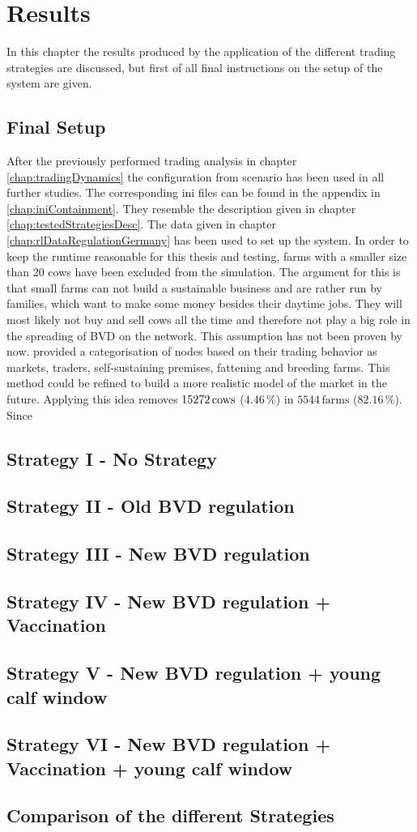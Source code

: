 \chapter{Results}
In this chapter the results produced by the application of the different trading strategies are discussed, but first of all final instructions on the setup of the system are given.
\section{Final Setup}
After the previously performed trading analysis in chapter \ref{chap:tradingDynamics} the configuration from scenario has been used in all further studies. The corresponding ini files can be found in the appendix in \ref{chap:iniContainment}. They resemble the description given in chapter \ref{chap:testedStrategiesDesc}. The data given in chapter \ref {chap:rlDataRegulationGermany} has been used to set up the system. In order to keep the runtime reasonable for this thesis and testing, farms with a smaller size than 20 cows have been excluded from the simulation. The argument for this is that small farms can not build a sustainable business and are rather run by families, which want to make some money besides their daytime jobs. They will most likely not buy and sell cows all the time and therefore not play a big role in the spreading of BVD on the network. This assumption has not been proven by now. \citep{steinbach16} provided a categorisation of nodes based on their trading behavior as markets, traders, self-sustaining premises, fattening and breeding farms. This method could be refined to build a more realistic model of the market in the future. 
Applying this idea removes $15272\,\text{cows}$ ($4.46\,\%$) in $5544\,\text{farms}$ ($82.16\,\%$).
Since 
\section{Strategy I - No Strategy}

\section{Strategy II - Old BVD regulation}
\section{Strategy III - New BVD regulation}
\section{Strategy IV - New BVD regulation + Vaccination}
\section{Strategy V - New BVD regulation + young calf window}
\section{Strategy VI - New BVD regulation + Vaccination + young calf window} 
\section{Comparison of the different Strategies}